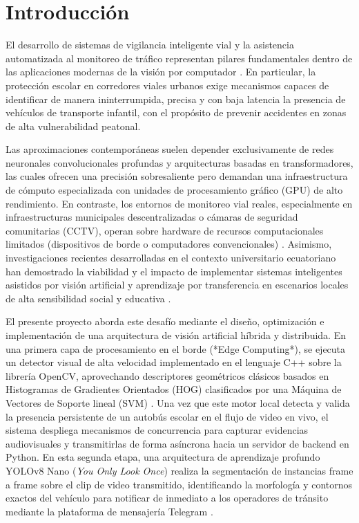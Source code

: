 \documentclass[12pt]{article}
\begin{document}
\tableofcontents
\listoftables
\listoffigures
\pagebreak


\section{Introducción}
El desarrollo de sistemas de vigilancia inteligente vial y la asistencia automatizada al monitoreo de tráfico representan pilares fundamentales dentro de las aplicaciones modernas de la visión por computador \cite{bradski2000opencv}. En particular, la protección escolar en corredores viales urbanos exige mecanismos capaces de identificar de manera ininterrumpida, precisa y con baja latencia la presencia de vehículos de transporte infantil, con el propósito de prevenir accidentes en zonas de alta vulnerabilidad peatonal. 

Las aproximaciones contemporáneas suelen depender exclusivamente de redes neuronales convolucionales profundas y arquitecturas basadas en transformadores, las cuales ofrecen una precisión sobresaliente pero demandan una infraestructura de cómputo especializada con unidades de procesamiento gráfico (GPU) de alto rendimiento. En contraste, los entornos de monitoreo vial reales, especialmente en infraestructuras municipales descentralizadas o cámaras de seguridad comunitarias (CCTV), operan sobre hardware de recursos computacionales limitados (dispositivos de borde o computadores convencionales) \cite{dalal2005hog}. Asimismo, investigaciones recientes desarrolladas en el contexto universitario ecuatoriano han demostrado la viabilidad y el impacto de implementar sistemas inteligentes asistidos por visión artificial y aprendizaje por transferencia en escenarios locales de alta sensibilidad social y educativa \cite{robles2022inteligencia, robles2023mobile}.

El presente proyecto aborda este desafío mediante el diseño, optimización e implementación de una arquitectura de visión artificial híbrida y distribuida. En una primera capa de procesamiento en el borde (*Edge Computing*), se ejecuta un detector visual de alta velocidad implementado en el lenguaje C++ sobre la librería OpenCV, aprovechando descriptores geométricos clásicos basados en Histogramas de Gradientes Orientados (HOG) clasificados por una Máquina de Vectores de Soporte lineal (SVM) \cite{pedregosa2011scikit}. Una vez que este motor local detecta y valida la presencia persistente de un autobús escolar en el flujo de video en vivo, el sistema despliega mecanismos de concurrencia para capturar evidencias audiovisuales y transmitirlas de forma asíncrona hacia un servidor de backend en Python. En esta segunda etapa, una arquitectura de aprendizaje profundo YOLOv8 Nano (\emph{You Only Look Once}) realiza la segmentación de instancias frame a frame sobre el clip de video transmitido, identificando la morfología y contornos exactos del vehículo para notificar de inmediato a los operadores de tránsito mediante la plataforma de mensajería Telegram \cite{jocher2023yolo}.
\end{document}
